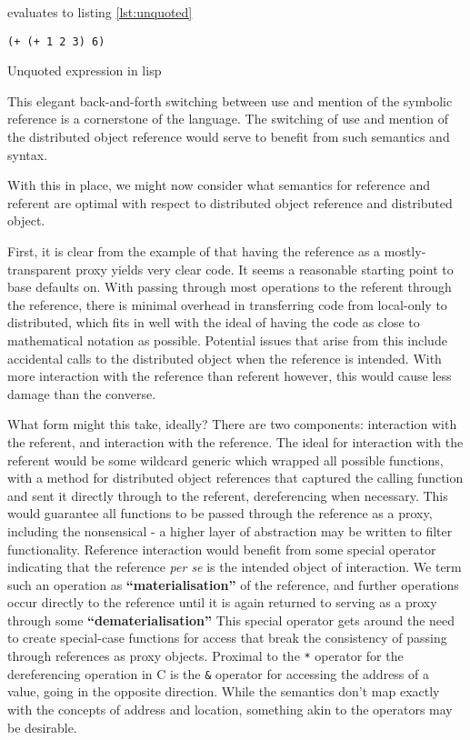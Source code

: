 evaluates to listing \cref{lst:unquoted}

\begin{listing}
    \begin{verbatim}
(+ (+ 1 2 3) 6)
    \end{verbatim}
    \caption{Unquoted expression in lisp}
    \label{lst:unquoted}
\end{listing}


This elegant back-and-forth switching between use and mention of the
symbolic reference is a cornerstone of the language. The switching of
use and mention of the distributed object reference would serve to
benefit from such semantics and syntax.

With this in place, we might now consider what semantics for reference
and referent are optimal with respect to distributed object reference
and distributed object.

First, it is clear from the example of  that having the reference as
a mostly-transparent proxy yields very clear code. It seems a reasonable
starting point to base defaults on. With passing through most operations
to the referent through the reference, there is minimal overhead in
transferring code from local-only to distributed, which fits in well
with the ideal of having the code as close to mathematical notation as
possible. Potential issues that arise from this include accidental calls
to the distributed object when the reference is intended. With more
interaction with the reference than referent however, this would cause
less damage than the converse.

What form might this take, ideally? There are two components:
interaction with the referent, and interaction with the reference. The
ideal for interaction with the referent would be some wildcard generic
which wrapped all possible functions, with a method for distributed
object references that captured the calling function and sent it
directly through to the referent, dereferencing when necessary. This
would guarantee all functions to be passed through the reference as a
proxy, including the nonsensical - a higher layer of abstraction may be
written to filter functionality. Reference interaction would benefit
from some special operator indicating that the reference \emph{per se}
is the intended object of interaction. We term such an operation as
\textbf{``materialisation''} of the reference, and further operations
occur directly to the reference until it is again returned to serving as
a proxy through some \textbf{``dematerialisation''} This special
operator gets around the need to create special-case functions for
access that break the consistency of passing through references as proxy
objects. Proximal to the \texttt{*} operator for the dereferencing
operation in C is the \texttt{\&} operator for accessing the address of
a value, going in the opposite direction. While the semantics don't map
exactly with the concepts of address and location, something akin to the
operators may be desirable.

